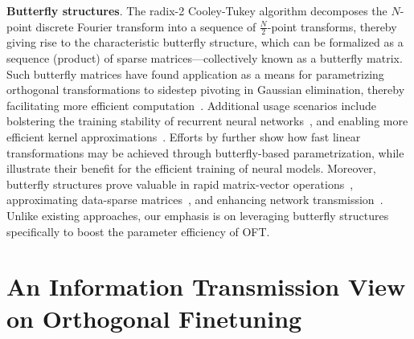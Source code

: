 \textbf{Butterfly structures}. The radix-2 Cooley-Tukey algorithm decomposes the $N$-point discrete Fourier transform into a sequence of $\frac{N}{2}$-point transforms, thereby giving rise to the characteristic butterfly structure, which can be formalized as a sequence (product) of sparse matrices—collectively known as a butterfly matrix. Such butterfly matrices have found application as a means for parametrizing orthogonal transformations to sidestep pivoting in Gaussian elimination, thereby facilitating more efficient computation~\cite{parker1995random}. Additional usage scenarios include bolstering the training stability of recurrent neural networks~\cite{jing2017tunable}, and enabling more efficient kernel approximations~\cite{munkhoeva2018quadrature}. Efforts by \cite{dao2019learning,dao2019kaleidoscope} further show how fast linear transformations may be achieved through butterfly-based parametrization, while \cite{chen2022pixelated,dao2022monarch} illustrate their benefit for the efficient training of neural models. Moreover, butterfly structures prove valuable in rapid matrix-vector operations~\cite{michielssen1996multilevel,o2010algorithm}, approximating data-sparse matrices~\cite{li2015butterfly}, and enhancing network transmission~\cite{klasing1994broadcasting,li2003linear,rajasingh2016transmission}. Unlike existing approaches, our emphasis is on leveraging butterfly structures specifically to boost the parameter efficiency of OFT.

\section{An Information Transmission View on Orthogonal Finetuning}

